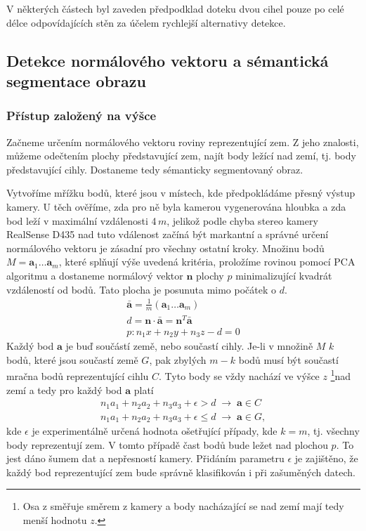 \documentclass[twoside]{ctuthesis}
\newcommand{\tl}[1]{$\mathbf{#1}$}
\begin{document}
V některých částech byl zaveden předpodklad doteku dvou cihel pouze po celé délce odpovídajících stěn za účelem rychlejší alternativy detekce.
\subsection{Detekce normálového vektoru a sémantická segmentace obrazu}
\label{sec:normal_est}
\subsubsection{Přístup založený na výšce}
\label{subsec:height}
Začneme určením normálového vektoru roviny reprezentující zem. Z jeho znalosti, můžeme odečtením plochy představující zem, najít body ležící nad zemí, tj. body představující cihly. Dostaneme tedy sémanticky segmentovaný obraz.

Vytvoříme mřížku bodů, které jsou v místech, kde předpokládáme přesný výstup kamery. U těch ověříme, zda pro ně byla kamerou vygenerována hloubka a zda bod leží v maximální vzdálenosti 4\,$m$, jelikož podle \cite{keselman2017intel}  chyba stereo kamery RealSense D435 nad tuto vdálenost začíná být markantní a správné určení normálového vektoru je zásadní pro všechny ostatní kroky. Množinu bodů $M = \mathbf{a}_1 \dotsc \mathbf{a}_m$, které splňují výše uvedená kritéria, proložíme rovinou pomocí PCA algoritmu a dostaneme normálový vektor \tl{n} plochy $p$ minimalizující kvadrát vzdáleností od bodů. Tato plocha je posunuta mimo počátek o $d$.
\begin{align}
    \mathbf{\bar{a}} = \frac{1}{m}\left( \mathbf{a}_1 \dotsc \mathbf{a}_m \right) \\
    d = \mathbf{n} \cdot \mathbf{\bar{a}} = \mathbf{n}^T \mathbf{\bar{a}} \\
    p: n_1x + n_2y + n_3z - d = 0 \label{normal_plane}
\end{align}
Každý bod \tl{a} je buď součástí země, nebo součastí cihly. Je-li v množině $M$ $k$ bodů, které jsou součastí země $G$, pak zbylých $m - k$ bodů musí být součastí mračna bodů reprezentující cihlu $C$. Tyto body se vždy nachází ve výšce $z$ \footnote{Osa z směřuje směrem z kamery a body nacházající se nad zemí mají tedy menší hodnotu $z$.}nad zemí a tedy pro každý bod \tl{a} platí
\begin{align}
    n_1a_1 + n_2a_2 + n_3a_3 + \epsilon > d \; \rightarrow \; \mathbf{a} \in C  \\
    n_1a_1 + n_2a_2 + n_3a_3 + \epsilon \leq d \; \rightarrow \; \mathbf{a} \in G,
\end{align}
kde $\epsilon$ je experimentálně určená hodnota ošetřující případy, kde $k = m$, tj. všechny body reprezentují zem. V tomto případě čast bodů bude ležet nad plochou $p$. To jest dáno šumem dat a nepřesností kamery. Přidáním parametru $\epsilon$ je zajištěno, že každý bod reprezentující zem bude správně klasifikován i při zašuměných datech.
\end{document}
